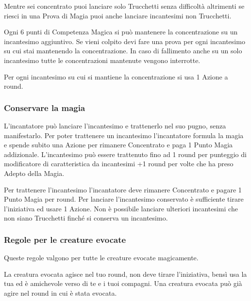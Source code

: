 \begin{multicols}{2}

Mentre sei concentrato puoi lanciare solo Trucchetti senza difficoltà altrimenti se riesci in una Prova di Magia puoi anche lanciare incantesimi non Trucchetti.

Ogni 6 punti di Competenza Magica si può mantenere la concentrazione su un incantesimo aggiuntivo. Se vieni colpito devi fare una prova per ogni incantesimo su cui stai mantenendo la concentrazione. In caso di fallimento anche su un solo incantesimo tutte le concentrazioni mantenute vengono interrotte.

Per ogni incantesimo su cui si mantiene la concentrazione si usa 1 Azione a round.

\subsubsection{Conservare la magia}\label{magieconservare}

L'incantatore può lanciare l'incantesimo e trattenerlo nel suo pugno, senza manifestarlo. Per poter trattenere un incantesimo l'incantatore formula la magia e spende subito una Azione per rimanere Concentrato e paga 1 Punto Magia addizionale.
L'incantesimo può essere trattenuto fino ad 1 round per punteggio di modificatore di caratteristica da incantesimi +1 round per volte che ha preso Adepto della Magia.

Per trattenere l'incantesimo l'incantatore deve rimanere Concentrato e pagare 1 Punto Magia per round.
Per lanciare l'incantesimo conservato è sufficiente tirare l'iniziativa ed usare 1 Azione. Non è possibile lanciare ulteriori incantesimi che non siano Trucchetti finché si conserva un incantesimo.

\subsubsection{Regole per le creature evocate}

Queste regole valgono per tutte le creature evocate magicamente.

La creatura evocata agisce nel tuo round, non deve tirare l'iniziativa, bensì usa la tua ed è amichevole verso di te e i tuoi compagni. Una creatura evocata può già agire nel round in cui è stata evocata.


\end{multicols}

